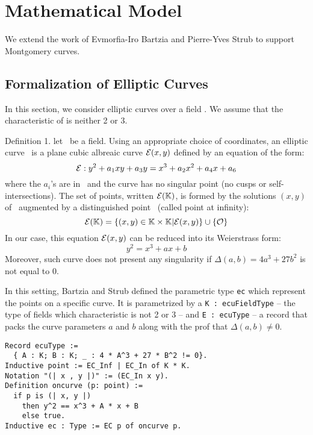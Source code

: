 \section{Mathematical Model}

We extend the work of Evmorfia-Iro Bartzia and Pierre-Yves Strub \cite{DBLP:conf/itp/BartziaS14} to support Montgomery curves.

\subsection{Formalization of Elliptic Curves}

In this section, we consider elliptic curves over a field \K. We assume that the characteristic of \K is neither 2 or 3.

Definition 1. let \K\ be a field. Using an appropriate choice of coordinates, an elliptic curve \E\ is a plane cubic albreaic curve $\mathcal{E}(x,y)$ defined by an equation of the form:
$$\mathcal{E} : y^2 + a_1 xy + a_3 y = x^3 + a_2 x^2 + a_4 x + a_6$$
where the $a_i$'s are in \K\ and the curve has no singular point (\ie no cusps or self-intersections). The set of points, written $\mathcal{E}(\mathbb{K})$, is formed by the solutions $(x,y)$ of \E\ augmented by a distinguished point \Oinf\ (called point at infinity):
$$\mathcal{E}(\mathbb{K}) = \{(x,y) \in \mathbb{K} \times \mathbb{K} | \mathcal{E}(x,y)\} \cup \{\mathcal{O}\}$$
In our case, this equation $\mathcal{E}(x,y)$ can be reduced into its Weierstrass form:
$$y^2 = x^3 + ax + b$$
Moreover, such curve does not present any singularity if $\Delta(a,b) = 4a^3 + 27b^2$ is not equal to $0$.

In this setting, Bartzia and Strub defined the parametric type \texttt{ec} which represent the points on a specific curve. It is parametrized by a \texttt{K : ecuFieldType} -- the type of fields which characteristic is not 2 or 3 -- and \texttt{E : ecuType} -- a record that packs the curve parameters $a$ and $b$ along with the prof that $\Delta(a,b) \neq 0$.

\begin{lstlisting}[language=Coq]
Record ecuType :=
  { A : K; B : K; _ : 4 * A^3 + 27 * B^2 != 0}.
Inductive point := EC_Inf | EC_In of K * K.
Notation "(| x , y |)" := (EC_In x y).
Definition oncurve (p: point) :=
  if p is (| x, y |)
    then y^2 == x^3 + A * x + B
    else true.
Inductive ec : Type := EC p of oncurve p.
\end{lstlisting}
